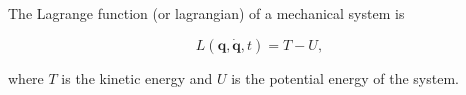 The Lagrange function (or lagrangian) of a mechanical system is

$$L(\mathbf{q}, \dot{\mathbf{q}}, t) = T - U,$$

where $T$ is the kinetic energy and $U$ is the potential energy of the system.
